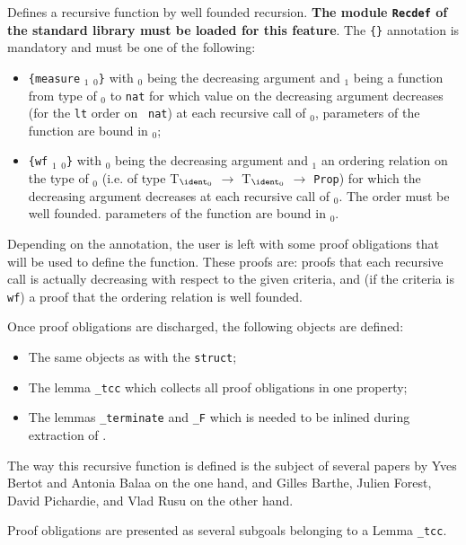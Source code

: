 \begin{Variants}
Defines a recursive function by well founded recursion. \textbf{The
module \texttt{Recdef} of the standard library must be loaded for this
feature}. The {\tt \{\}} annotation is mandatory and must be one of
the following:
\begin{itemize}
\item {\tt \{measure} \term$_1$ \ident$_0${\tt\}} with \ident$_0$
      being the decreasing argument and \term$_1$ being a function
      from type of \ident$_0$ to \texttt{nat} for which value on the
      decreasing argument decreases (for the {\tt lt} order on {\tt
      nat}) at each recursive call of \term$_0$, parameters of the
      function are bound in  \term$_0$;
\item {\tt \{wf} \term$_1$ \ident$_0${\tt\}} with \ident$_0$ being
      the decreasing argument and \term$_1$ an ordering relation on
      the type of \ident$_0$ (i.e. of type T$_{\ident_0}$
      $\to$ T$_{\ident_0}$ $\to$ {\tt Prop}) for which
      the decreasing argument decreases at each recursive call of
      \term$_0$. The order must be well founded. parameters of the
      function are bound in  \term$_0$.
\end{itemize} 

Depending on the annotation, the user is left with some proof
obligations that will be used to define the function. These proofs
are: proofs that each recursive call is actually decreasing with
respect to the given criteria, and (if the criteria is \texttt{wf}) a
proof that the ordering relation is well founded.


Once proof obligations are discharged, the following objects are
defined:

\begin{itemize}
\item The same objects as with the \texttt{struct};
\item The lemma \texttt{\ident\_tcc} which collects all proof
  obligations in one property;
\item The lemmas \texttt{\ident\_terminate} and \texttt{\ident\_F}
  which is needed to be inlined during extraction of \ident.
\end{itemize}



The way this recursive function is defined is the subject of several
papers by Yves Bertot and Antonia Balaa on the one hand, and Gilles Barthe,
Julien Forest, David Pichardie, and Vlad Rusu on the other hand.


\bigskip

 Proof obligations are presented as several
subgoals belonging to a Lemma {\ident}{\tt\_tcc}. %




\end{Variants}



